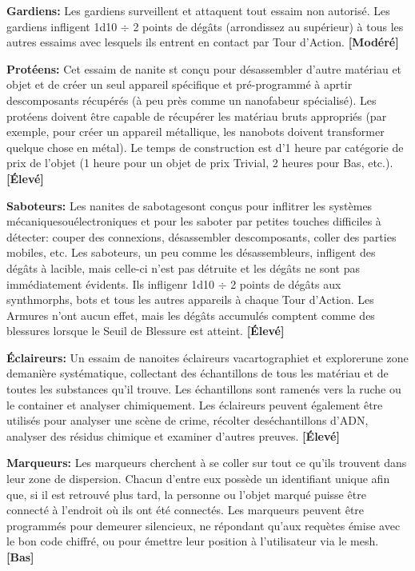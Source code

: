 \textbf{Gardiens:} Les gardiens surveillent et attaquent tout essaim non autorisé. Les gardiens infligent 1d10 $\div$ 2 points de dégâts (arrondissez au supérieur) à tous les autres essaims avec lesquels ils entrent en contact par Tour d'Action. \textbf{[Modéré]} 

\textbf{Protéens:} Cet essaim de nanite st conçu pour désassembler d'autre matériau et objet et de créer un seul appareil spécifique et pré-programmé à aprtir descomposants récupérés (à peu près comme un nanofabeur spécialisé). Les protéens doivent être capable de récupérer les matériau bruts appropriés (par exemple, pour créer un appareil métallique, les nanobots doivent transformer quelque chose en métal). Le temps de construction est d'1 heure par catégorie de prix de l'objet (1 heure pour un objet de prix Trivial, 2 heures pour Bas, etc.). \textbf{[Élevé]} 

\textbf{Saboteurs:} Les nanites de sabotagesont conçus pour inflitrer les systèmes mécaniquesouélectroniques et pour les saboter par petites touches difficiles à détecter: couper des connexions, désassembler descomposants, coller des parties mobiles, etc. Les saboteurs, un peu comme les désassembleurs, infligent des dégâts à lacible, mais celle-ci n'est pas détruite et les dégâts ne sont pas immédiatement évidents. Ils infligenr 1d10 $\div$ 2 points de dégâts aux synthmorphs, bots et tous les autres appareils à chaque Tour d'Action. Les Armures n'ont aucun effet, mais les dégâts accumulés comptent comme des blessures lorsque le Seuil de Blessure est atteint. \textbf{[Élevé]} 

\textbf{Éclaireurs:} Un essaim de nanoites éclaireurs vacartographiet et explorerune zone demanière systématique, collectant des échantillons de tous les matériau et de toutes les substances qu'il trouve. Les échantillons sont ramenés vers la ruche ou le container et analyser chimiquement. Les éclaireurs peuvent également être utilisés pour analyser une scène de crime, récolter deséchantillons d'ADN, analyser des résidus chimique et examiner d'autres preuves. \textbf{[Élevé]} 

\textbf{Marqueurs:} Les marqueurs cherchent à se coller sur tout ce qu'ils trouvent dans leur zone de dispersion. Chacun d'entre eux possède un identifiant unique afin que, si il est retrouvé plus tard, la personne ou l'objet marqué puisse être connecté à l'endroit où ils ont été connectés. Les marqueurs peuvent être programmés pour demeurer silencieux, ne répondant qu'aux requètes émise avec le bon code chiffré, ou pour émettre leur position à l'utilisateur via le mesh. \textbf{[Bas]} 



